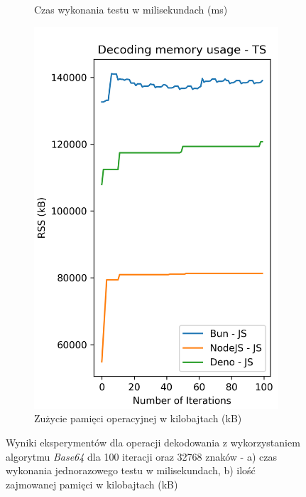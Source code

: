 \begin{figure}[H]
\begin{subfigure}[b]{0.44\textwidth}
    \caption{Czas wykonania testu w milisekundach (ms)}
    \label{fig:decoding_e1_js_time}
  \end{subfigure}
  \begin{subfigure}[b]{0.44\textwidth}
    \centering
    \includegraphics[width=\textwidth]{Figures/coding/base64_100_decoding_js_memory.png}
    \caption{Zużycie pamięci operacyjnej w kilobajtach (kB)}
    \label{fig:decoding_e1_js_memory}
  \end{subfigure}
  \hfill
  \caption{Wyniki eksperymentów dla operacji dekodowania z wykorzystaniem algorytmu \textit{Base64} dla 100 iteracji oraz 32768 znaków - a) czas wykonania jednorazowego testu w milisekundach, b) ilość zajmowanej pamięci w kilobajtach (kB)}
  \label{fig:decoding_e1_js}
\end{figure}

